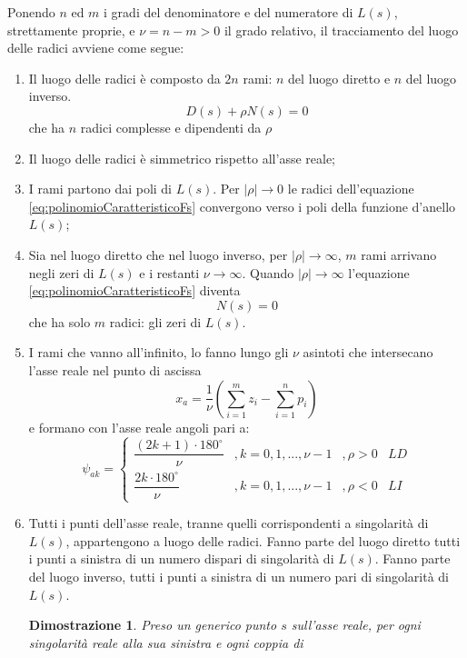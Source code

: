 \documentclass[a4paper]{report}
\newtheorem{dimostrazione}{Dimostrazione}
\begin{document}
Ponendo $n$ ed $m$ i gradi del denominatore e del numeratore di
$L(s)$, strettamente proprie, e $\nu = n - m > 0$ il grado relativo,
il tracciamento del luogo delle radici avviene come segue:
\begin{enumerate}
\item Il luogo delle radici \`e composto da $2n$ rami: $n$ del luogo
  diretto e $n$ del luogo inverso.
  \begin{equation}\label{eq:polinomioCaratteristicoFs}
    D(s) + \rho N(s) = 0
  \end{equation}
  che ha $n$ radici complesse e dipendenti da $\rho$
\item Il luogo delle radici \`e simmetrico rispetto all'asse reale;
\item I rami partono dai poli di $L(s)$. Per $|\rho| \to 0$ le radici
  dell'equazione \ref{eq:polinomioCaratteristicoFs} convergono verso i
  poli della funzione d'anello $L(s)$;
\item Sia nel luogo diretto che nel luogo inverso, per $|\rho| \to
  \infty$, $m$ rami arrivano negli zeri di $L(s)$ e i restanti $\nu
  \to \infty$. Quando $|\rho| \to \infty$ l'equazione
  \ref{eq:polinomioCaratteristicoFs} diventa
  \[
  N(s) = 0
  \]
  che ha solo $m$ radici: gli zeri di $L(s)$.
\item I rami che vanno all'infinito, lo fanno lungo gli $\nu$ asintoti
  che intersecano l'asse reale nel punto di ascissa
  \begin{equation}\label{eq:xa}
    x_a = \dfrac{1}{\nu} \left( \sum_{i = 1}^{m} z_i - \sum_{i =
      1}^{n} p_i  \right) 
  \end{equation}
  e formano con l'asse reale angoli pari a:
  \[
  \psi_{ak} =
  \left \{
  \begin{array}{llll}
    \dfrac{(2k + 1) \cdot 180^{\circ}}{\nu} &, k=0,1,...,\nu - 1 &,
    \rho > 0 & LD\\
    \dfrac{2k \cdot 180^{\circ}}{\nu} &, k=0,1,...,\nu - 1 &,
    \rho < 0 & LI
  \end{array}
  \right .
  \]
\item Tutti i punti dell'asse reale, tranne quelli corrispondenti a
  singolarit\`a di $L(s)$, appartengono a luogo delle radici. Fanno
  parte del luogo diretto tutti i punti a sinistra di un numero
  dispari di singolarit\`a di $L(s)$. Fanno parte del luogo inverso,
  tutti i punti a sinistra di un numero pari di singolarit\`a di
  $L(s)$.
  \begin{dimostrazione}
    Preso un generico punto $s$ sull'asse reale, per ogni
    singolarit\`a reale alla sua sinistra e ogni coppia di

\end{dimostrazione}
\end{enumerate}
\end{document}
